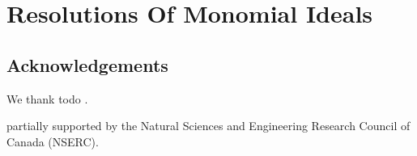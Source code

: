 \documentclass[12pt,leqno]{amsart}
\theoremstyle{definition}
\begin{document}
%
\section{Resolutions Of Monomial Ideals}



\subsection*{Acknowledgements}
We thank todo .
               
partially supported by
the Natural Sciences and Engineering Research Council of Canada (NSERC).


\end{document}
